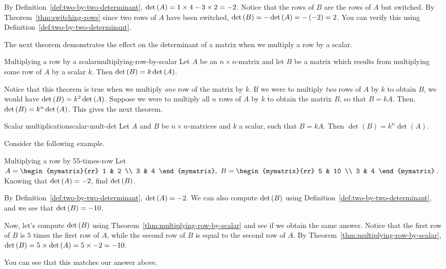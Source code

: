\begin{solution}
By Definition~\ref{def:two-by-two-determinant}, 
$\det \left(A\right) = 1 \times 4 - 3 \times 2 = -2$. 
Notice that the rows of $B$ are the rows of $A$ but switched. 
By Theorem~\ref{thm:switching-rows} since two rows of $A$ have been switched,
$\det \left(B\right) = - \det \left(A\right) = - \left(-2\right) = 2$.
You can verify this using Definition~\ref{def:two-by-two-determinant}. 
\end{solution}

The next theorem demonstrates the effect on the determinant of a matrix when we multiply
a row by a scalar.

\begin{theorem}{Multiplying a row by a scalar}{multiplying-row-by-scalar}
Let $A$ be an $n\times n$-matrix and let $B$ be a matrix
which results from multiplying some row of $A$ by a scalar $k$. Then $\det
\left(B\right) = k \det \left(A\right)$.
\end{theorem}

Notice that this theorem is true when we multiply {\em one\em} row of the matrix by $k$.
If we were to multiply {\em two\em} rows of $A$ by $k$ to obtain $B$, we would have
$\det \left(B\right) = k^2 \det \left(A\right)$.
Suppose we were to multiply all $n$ rows of $A$ by $k$ to obtain the matrix $B$, so that 
$B = kA$. Then, $\det \left(B\right) = k^n \det \left(A\right)$. This gives the next theorem.

\begin{theorem}{Scalar multiplication}{scalar-mult-det}
Let $A$ and $B$ be $n \times n$-matrices and $k$ a scalar, such that $B = kA$. Then $\det(B) = k^n \det(A)$.
\end{theorem}

Consider the following example.

\begin{example}{Multiplying a row by 5}{5-times-row}
Let $A=\begin{mymatrix}{rr}
1 & 2 \\
3 & 4
\end{mymatrix} ,\ B=\begin{mymatrix}{rr}
5 & 10 \\
3 & 4
\end{mymatrix}$. 
Knowing that $\det \left(A \right) =-2$, find  $\det \left(B\right)$.
\end{example}

\begin{solution} 
By Definition~\ref{def:two-by-two-determinant}, $\det \left(A\right) =-2$. We can also compute
$\det \left(B\right)$ using Definition~\ref{def:two-by-two-determinant}, and we see that $\det \left(B\right) = -10$. 

Now, let's compute  $\det \left(B\right)$ using Theorem~\ref{thm:multiplying-row-by-scalar} and see if we
obtain the same answer. Notice that the first row of $B$ is $5$ times the first row of $A$, while the
second row of $B$ is equal to the second row of $A$. 
By Theorem~\ref{thm:multiplying-row-by-scalar}, 
$\det  \left(B\right) = 5 \times \det \left(A \right) = 5 \times -2 = -10$.

You can see that this matches our answer above.
\end{solution}

